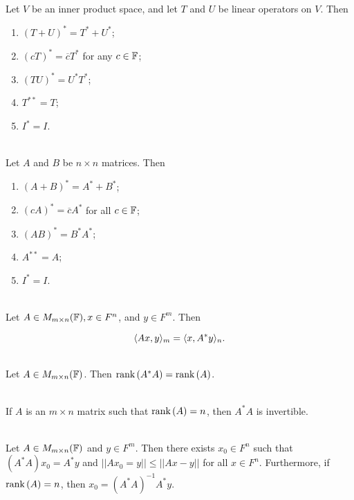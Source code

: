 \begin{theorem}
	\hfill\\
	Let $V$ be an inner product space, and let $T$ and $U$ be linear operators on $V$. Then

	\begin{enumerate}
		\item $(T+U)^* = T^* + U^*$;
		\item $(cT)^* = \overline{c}T^*$ for any $c \in \mathbb{F}$;
		\item $(TU)^* = U^*T^*$;
		\item $T^{**} = T$;
		\item $I^* = I$.
	\end{enumerate}
\end{theorem}

\begin{corollary}
	\hfill\\
	Let $A$ and $B$ be $n \times n$ matrices. Then

	\begin{enumerate}
		\item $(A + B)^* = A^* + B^*$;
		\item $(cA)^* = \overline{c}A^*$ for all $c \in \mathbb{F}$;
		\item $(AB)^* = B^*A^*$;
		\item $A^{**} = A$;
		\item $I^* = I$.
	\end{enumerate}
\end{corollary}

\begin{lemma}
	\hfill\\
	Let $A \in M_{m \times n}(\mathbb{F}), x \in F^n$, and $y \in F^m$. Then

	\[\langle Ax,y\rangle_m = \langle x,A^*y\rangle_n.\]
\end{lemma}

\begin{lemma}
	\hfill\\
	Let $A \in M_{m \times n}(\mathbb{F})$. Then $\text{rank}\left(A^*A\right) = \text{rank}\left(A\right)$.
\end{lemma}

\begin{corollary}
	\hfill\\
	If $A$ is an $m \times n$ matrix such that $\text{rank}\left(A\right) = n$, then $A^*A$ is invertible.
\end{corollary}

\begin{theorem}
	\hfill\\
	Let $A \in M_{m \times n}(\mathbb{F})$ and $y \in F^m$. Then there exists $x_0 \in F^n$ such that $(A^*A)x_0 = A^*y$ and $||Ax_0 = y|| \leq ||Ax - y||$ for all $x \in F^n$. Furthermore, if $\text{rank}\left(A\right) = n$, then $x_0 = (A^*A)^{-1}A^*y$.
\end{theorem}

